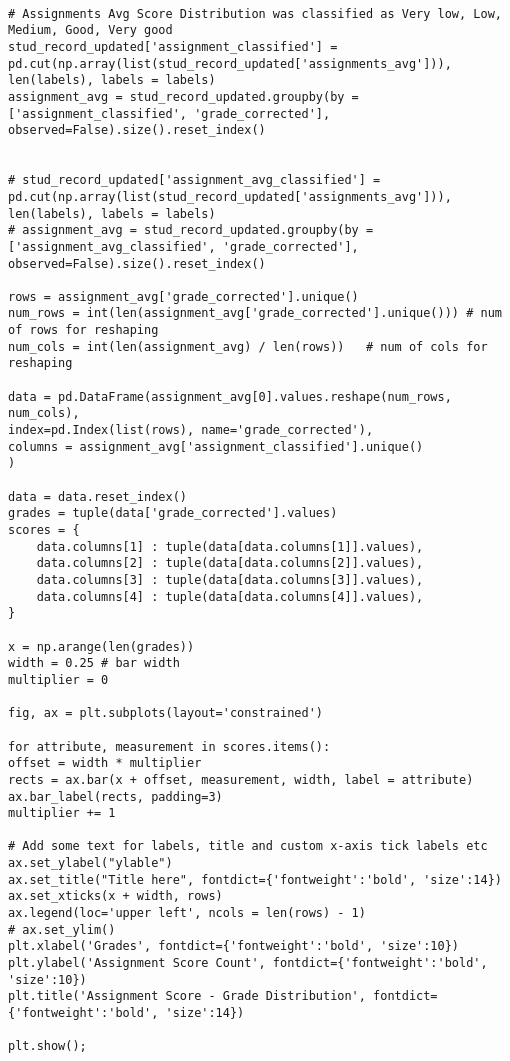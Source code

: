 \label{code:grade_assignment}
\begin{verbatim}
	
# Assignments Avg Score Distribution was classified as Very low, Low, Medium, Good, Very good
stud_record_updated['assignment_classified'] = pd.cut(np.array(list(stud_record_updated['assignments_avg'])), len(labels), labels = labels)
assignment_avg = stud_record_updated.groupby(by = ['assignment_classified', 'grade_corrected'], observed=False).size().reset_index()


# stud_record_updated['assignment_avg_classified'] = pd.cut(np.array(list(stud_record_updated['assignments_avg'])), len(labels), labels = labels)
# assignment_avg = stud_record_updated.groupby(by = ['assignment_avg_classified', 'grade_corrected'], observed=False).size().reset_index()

rows = assignment_avg['grade_corrected'].unique()
num_rows = int(len(assignment_avg['grade_corrected'].unique())) # num of rows for reshaping
num_cols = int(len(assignment_avg) / len(rows))   # num of cols for reshaping

data = pd.DataFrame(assignment_avg[0].values.reshape(num_rows, num_cols), 
index=pd.Index(list(rows), name='grade_corrected'),
columns = assignment_avg['assignment_classified'].unique()
)

data = data.reset_index()
grades = tuple(data['grade_corrected'].values)
scores = {
	data.columns[1] : tuple(data[data.columns[1]].values),
	data.columns[2] : tuple(data[data.columns[2]].values),
	data.columns[3] : tuple(data[data.columns[3]].values),
	data.columns[4] : tuple(data[data.columns[4]].values),
}

x = np.arange(len(grades))
width = 0.25 # bar width
multiplier = 0

fig, ax = plt.subplots(layout='constrained')

for attribute, measurement in scores.items():
offset = width * multiplier 
rects = ax.bar(x + offset, measurement, width, label = attribute)
ax.bar_label(rects, padding=3)
multiplier += 1

# Add some text for labels, title and custom x-axis tick labels etc
ax.set_ylabel("ylable")
ax.set_title("Title here", fontdict={'fontweight':'bold', 'size':14})
ax.set_xticks(x + width, rows)
ax.legend(loc='upper left', ncols = len(rows) - 1)
# ax.set_ylim()
plt.xlabel('Grades', fontdict={'fontweight':'bold', 'size':10})
plt.ylabel('Assignment Score Count', fontdict={'fontweight':'bold', 'size':10})
plt.title('Assignment Score - Grade Distribution', fontdict={'fontweight':'bold', 'size':14})

plt.show();
\end{verbatim}




